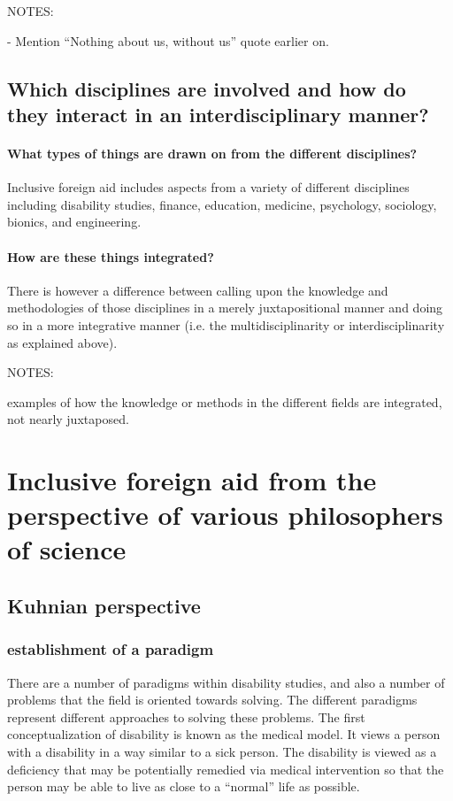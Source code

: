 \documentclass{lps}
\begin{document}
NOTES:

- Mention “Nothing about us, without us” quote earlier on.

\subsection{Which disciplines are involved and how do they interact in an
interdisciplinary manner?}

\paragraph{What types of things are drawn on from the different disciplines?}

Inclusive foreign aid includes aspects from a variety of different disciplines
including disability studies, finance, education, medicine, psychology,
sociology, bionics, and engineering. 

\paragraph{How are these things integrated?}

There is however a difference between calling upon the knowledge and
methodologies of those disciplines in a merely juxtapositional manner and
doing so in a more integrative manner (i.e. the multidisciplinarity or
interdisciplinarity as explained above).


NOTES:

examples of how the knowledge or methods in the different fields are
integrated, not nearly juxtaposed.

\section{Inclusive foreign aid from the perspective of various philosophers of
science}

\subsection{Kuhnian perspective}

\subsubsection{establishment of a paradigm}

There are a number of paradigms within disability studies, and also a number
of problems that the field is oriented towards solving. The different
paradigms represent different approaches to solving these problems. The first
conceptualization of disability is known as the medical model. It views a
person with a disability in a way similar to a sick person. The disability is
viewed as a deficiency that may be potentially remedied via medical
intervention so that the person may be able to live as close to a “normal”
life as possible. 
\end{document}

